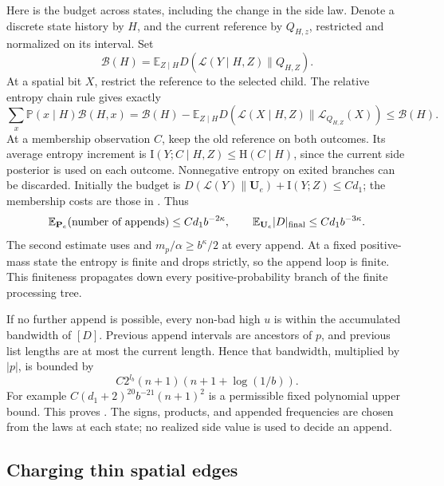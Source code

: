 Here is the budget across states, including the change in the side law.
Denote a discrete state history by $H$, and the current reference by
$Q_{H,z}$, restricted and normalized on its interval. Set
\[
 \mathcal B(H)=\mathbb E_{Z\mid H}
       D(\mathcal L(Y\mid H,Z)\|Q_{H,Z}).
\]
At a spatial bit $X$, restrict the reference to the selected child. The
relative entropy chain rule gives exactly
\[
 \sum_x\mathbb P(x\mid H)\mathcal B(H,x)
 =\mathcal B(H)-\mathbb E_{Z\mid H}
       D(\mathcal L(X\mid H,Z)\|\mathcal L_{Q_{H,Z}}(X))
 \le\mathcal B(H).
\]
At a membership observation $C$, keep the old reference on both outcomes.
Its average entropy increment is
$\mathrm I(Y;C\mid H,Z)\le\mathrm H(C\mid H)$, since the current side posterior is used
on each outcome. Nonnegative entropy on exited branches can be discarded.
Initially the budget is
$D(\mathcal L(Y)\|\mathbf U_e)+\mathrm I(Y;Z)\le Cd_1$; the membership costs are
those in . Thus
\begin{equation}\label{eq:07-append-budget}
 \mathbb E_{\mathbf P_e}(\text{number of appends})
       \le Cd_1b^{-2\kappa},\qquad
 \mathbb E_{\mathbf U_e}|D|_{\rm final}
       \le Cd_1b^{-3\kappa}.
\end{equation}
The second estimate uses  and
$m_p/\alpha\ge b^\kappa/2$ at every append. At a fixed positive-mass
state the entropy is finite and drops strictly, so the append loop is
finite. This finiteness propagates down every positive-probability branch
of the finite processing tree.

If no further append is possible, every non-bad high $u$ is within the
accumulated bandwidth of $[D]$. Previous append intervals are ancestors of
$p$, and previous list lengths are at most the current length. Hence that
bandwidth, multiplied by $|p|$, is bounded by
\[
 C2^{l_b}(n+1)(n+1+\log(1/b)).
\]
For example $C(d_1+2)^{20}b^{-21}(n+1)^2$ is a permissible fixed
polynomial upper bound. This proves . The signs,
products, and appended frequencies are chosen from the laws at each state;
no realized side value is used to decide an append.

\subsection{Charging thin spatial edges}

